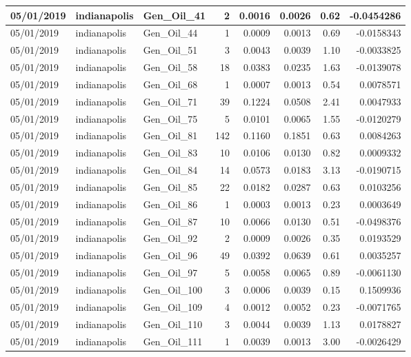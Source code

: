 \documentclass[
  letterpaper,
  DIV=11,
  numbers=noendperiod]{scrartcl}
\begin{document}
\begin{tabular}{l|l|l|r|r|r|r|r}
\hline
05/01/2019 & indianapolis & Gen\_Oil\_41 & 2 & 0.0016 & 0.0026 & 0.62 & -0.0454286\\
\hline
05/01/2019 & indianapolis & Gen\_Oil\_44 & 1 & 0.0009 & 0.0013 & 0.69 & -0.0158343\\
\hline
05/01/2019 & indianapolis & Gen\_Oil\_51 & 3 & 0.0043 & 0.0039 & 1.10 & -0.0033825\\
\hline
05/01/2019 & indianapolis & Gen\_Oil\_58 & 18 & 0.0383 & 0.0235 & 1.63 & -0.0139078\\
\hline
05/01/2019 & indianapolis & Gen\_Oil\_68 & 1 & 0.0007 & 0.0013 & 0.54 & 0.0078571\\
\hline
05/01/2019 & indianapolis & Gen\_Oil\_71 & 39 & 0.1224 & 0.0508 & 2.41 & 0.0047933\\
\hline
05/01/2019 & indianapolis & Gen\_Oil\_75 & 5 & 0.0101 & 0.0065 & 1.55 & -0.0120279\\
\hline
05/01/2019 & indianapolis & Gen\_Oil\_81 & 142 & 0.1160 & 0.1851 & 0.63 & 0.0084263\\
\hline
05/01/2019 & indianapolis & Gen\_Oil\_83 & 10 & 0.0106 & 0.0130 & 0.82 & 0.0009332\\
\hline
05/01/2019 & indianapolis & Gen\_Oil\_84 & 14 & 0.0573 & 0.0183 & 3.13 & -0.0190715\\
\hline
05/01/2019 & indianapolis & Gen\_Oil\_85 & 22 & 0.0182 & 0.0287 & 0.63 & 0.0103256\\
\hline
05/01/2019 & indianapolis & Gen\_Oil\_86 & 1 & 0.0003 & 0.0013 & 0.23 & 0.0003649\\
\hline
05/01/2019 & indianapolis & Gen\_Oil\_87 & 10 & 0.0066 & 0.0130 & 0.51 & -0.0498376\\
\hline
05/01/2019 & indianapolis & Gen\_Oil\_92 & 2 & 0.0009 & 0.0026 & 0.35 & 0.0193529\\
\hline
05/01/2019 & indianapolis & Gen\_Oil\_96 & 49 & 0.0392 & 0.0639 & 0.61 & 0.0035257\\
\hline
05/01/2019 & indianapolis & Gen\_Oil\_97 & 5 & 0.0058 & 0.0065 & 0.89 & -0.0061130\\
\hline
05/01/2019 & indianapolis & Gen\_Oil\_100 & 3 & 0.0006 & 0.0039 & 0.15 & 0.1509936\\
\hline
05/01/2019 & indianapolis & Gen\_Oil\_109 & 4 & 0.0012 & 0.0052 & 0.23 & -0.0071765\\
\hline
05/01/2019 & indianapolis & Gen\_Oil\_110 & 3 & 0.0044 & 0.0039 & 1.13 & 0.0178827\\
\hline
05/01/2019 & indianapolis & Gen\_Oil\_111 & 1 & 0.0039 & 0.0013 & 3.00 & -0.0026429\\

\end{tabular}
\end{document}
